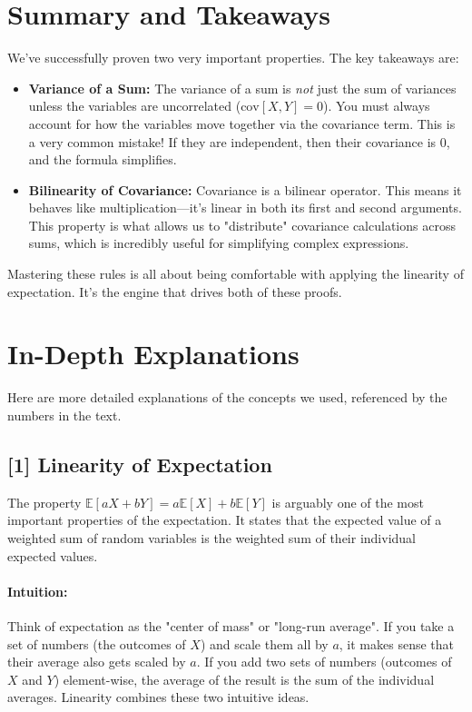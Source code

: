 \documentclass[11pt,a4paper]{article}
\newcommand{\noteTarget}[1]{\hypertarget{#1}{}}
\begin{document}
\section{Summary and Takeaways}
We've successfully proven two very important properties. The key takeaways are:
\begin{itemize}
    \item \textbf{Variance of a Sum:} The variance of a sum is \emph{not} just the sum of variances unless the variables are uncorrelated ($\text{cov}[X,Y]=0$). You must always account for how the variables move together via the covariance term. This is a very common mistake! If they are independent, then their covariance is 0, and the formula simplifies.
    \item \textbf{Bilinearity of Covariance:} Covariance is a bilinear operator. This means it behaves like multiplication—it's linear in both its first and second arguments. This property is what allows us to "distribute" covariance calculations across sums, which is incredibly useful for simplifying complex expressions.
\end{itemize}
Mastering these rules is all about being comfortable with applying the linearity of expectation. It's the engine that drives both of these proofs.

\newpage
\section*{In-Depth Explanations}

Here are more detailed explanations of the concepts we used, referenced by the numbers in the text.

\subsection*{\noteTarget{1} [1] Linearity of Expectation}
The property $\mathbb{E}[aX + bY] = a\mathbb{E}[X] + b\mathbb{E}[Y]$ is arguably one of the most important properties of the expectation. It states that the expected value of a weighted sum of random variables is the weighted sum of their individual expected values.
\paragraph{Intuition:} Think of expectation as the "center of mass" or "long-run average". If you take a set of numbers (the outcomes of $X$) and scale them all by $a$, it makes sense that their average also gets scaled by $a$. If you add two sets of numbers (outcomes of $X$ and $Y$) element-wise, the average of the result is the sum of the individual averages. Linearity combines these two intuitive ideas.
\end{document}
